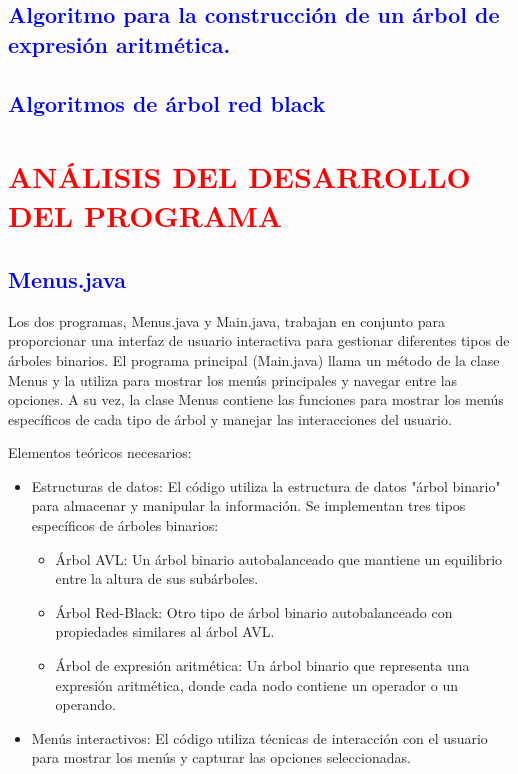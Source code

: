 \documentclass[12pt]{article}
\begin{document}
\subsection*{\textcolor{blue}{Algoritmo para la construcción de un árbol de expresión aritmética. }}

\subsection*{\textcolor{blue}{Algoritmos de árbol red black }}



\section*{\textcolor{red}{\textbf{ANÁLISIS DEL DESARROLLO DEL PROGRAMA}}}

\subsection*{\textcolor{blue}{Menus.java}}
Los dos programas, Menus.java y Main.java, trabajan en conjunto para proporcionar una interfaz de usuario interactiva para gestionar diferentes tipos de árboles binarios. El programa principal (Main.java) llama un método de la clase Menus y la utiliza para mostrar los menús principales y navegar entre las opciones. A su vez, la clase Menus contiene las funciones para mostrar los menús específicos de cada tipo de árbol y manejar las interacciones del usuario.
\par\vspace{0cm}
Elementos teóricos necesarios:
\begin{itemize}
    \item Estructuras de datos: El código utiliza la estructura de datos "árbol binario" para almacenar y manipular la información. Se implementan tres tipos específicos de árboles binarios:
    \begin{itemize}
        \item Árbol AVL: Un árbol binario autobalanceado que mantiene un equilibrio entre la altura de sus subárboles.
        \item Árbol Red-Black: Otro tipo de árbol binario autobalanceado con propiedades similares al árbol AVL.
        \item Árbol de expresión aritmética: Un árbol binario que representa una expresión aritmética, donde cada nodo contiene un operador o un operando.
    \end{itemize}
    \item Menús interactivos: El código utiliza técnicas de interacción con el usuario para mostrar los menús y capturar las opciones seleccionadas.
\end{itemize}
\end{document}

